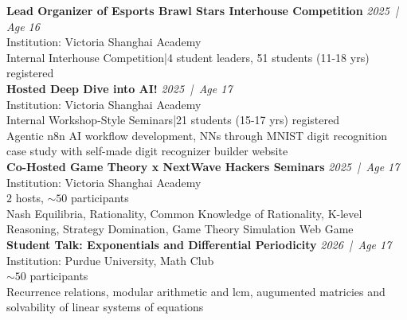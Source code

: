 \documentclass[a4paper,9pt]{extarticle}
\newcommand{\entryheader}[3]{%
    \noindent\textbf{#1} \hfill \textit{#2 \,|\, Age #3}
}
\begin{document}
    \noindent
    \entryheader{Lead Organizer of Esports Brawl Stars Interhouse Competition}{2025}{16} \\
    Institution: Victoria Shanghai Academy \\
    Internal Interhouse Competition|4 student leaders, 51 students (11-18 yrs) registered \\

    \noindent
    \entryheader{Hosted Deep Dive into AI!}{2025}{17} \\
    Institution: Victoria Shanghai Academy \\
    Internal Workshop-Style Seminars|21 students (15-17 yrs) registered \\
    Agentic n8n AI workflow development, NNs through MNIST digit recognition case study with self-made digit recognizer builder website \\ 

    \noindent
    \entryheader{Co-Hosted Game Theory x NextWave Hackers Seminars}{2025}{17} \\
    Institution: Victoria Shanghai Academy \\
    {$2$} hosts, {$\sim 50$} participants \\
    Nash Equilibria, Rationality, Common Knowledge of Rationality, K-level Reasoning, Strategy Domination, Game Theory Simulation Web Game \\ 

    \noindent
    \entryheader{Student Talk: Exponentials and Differential Periodicity}{2026}{17} \\
    Institution: Purdue University, Math Club \\
    {$\sim 50$} participants \\
    Recurrence relations, modular arithmetic and lcm, augumented matricies and solvability of linear systems of equations \\ 

\end{document}
